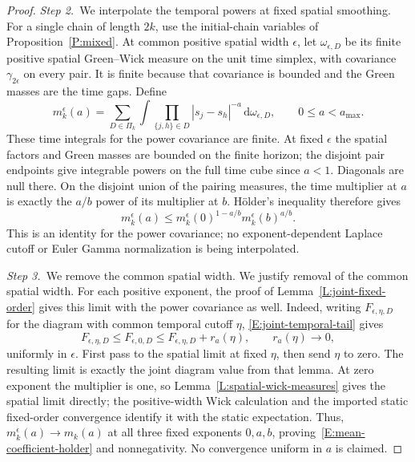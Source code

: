 \documentclass[12pt,oneside,openany]{book}
\numberwithin{equation}{section}
\theoremstyle{nogostyle}
\theoremstyle{definition}
\newcommand{\ud}{\,\mathrm{d}}
\begin{document}
\begin{proof}
  \medskip
  \noindent\textit{Step 2.~}We interpolate the temporal powers at fixed
  spatial smoothing.
  For a single chain of length $2k$, use the initial-chain variables of
  Proposition~\ref{P:mixed}. At common positive spatial width $\epsilon$, let
  $\omega_{\epsilon,D}$ be its finite positive spatial Green--Wick measure on
  the unit time simplex, with covariance $\gamma_{2\epsilon}$ on every pair. It
  is finite because that covariance is bounded and the Green masses are the time
  gaps. Define
  \[
    m_k^\epsilon(a)=\sum_{D\in\Pi_k}\int
    \prod_{\{j,h\}\in D}|s_j-s_h|^{-a}\ud\omega_{\epsilon,D},
    \qquad 0\le a<a_{\max}.
  \]
  These time integrals for the power covariance are finite. At fixed $\epsilon$
  the spatial factors and Green masses are bounded on the finite horizon; the
  disjoint pair endpoints give integrable powers on the full time cube since $a
  < 1$. Diagonals are null there. On the disjoint union of the pairing measures,
  the time multiplier at $a$ is exactly the $a/b$ power of its multiplier at
  $b$. H\"older's inequality therefore gives
  \[
    m_k^\epsilon(a)\le
    m_k^\epsilon(0)^{1-a/b}m_k^\epsilon(b)^{a/b}.
  \]
  This is an identity for the power covariance; no exponent-dependent Laplace
  cutoff or Euler Gamma normalization is being interpolated.


  \medskip
  \noindent\textit{Step 3.~}We remove the common spatial width.
  We justify removal of the common spatial width. For each positive exponent,
  the proof of Lemma~\ref{L:joint-fixed-order} gives this limit with the power
  covariance as well. Indeed, writing $F_{\epsilon,\eta,D}$ for the diagram with
  common temporal cutoff $\eta$, \eqref{E:joint-temporal-tail} gives
  \[
    F_{\epsilon,\eta,D}\le F_{\epsilon,0,D}
    \le F_{\epsilon,\eta,D}+r_a(\eta),\qquad r_a(\eta)\longrightarrow0,
  \]
  uniformly in $\epsilon$. First pass to the spatial limit at fixed $\eta$, then
  send $\eta$ to zero. The resulting limit is exactly the joint diagram value
  from that lemma. At zero exponent the multiplier is one, so
  Lemma~\ref{L:spatial-wick-measures} gives the spatial limit directly; the
  positive-width Wick calculation and the imported static fixed-order
  convergence identify it with the static expectation. Thus, $m_k^\epsilon(a)
  \to m_k(a)$ at all three fixed exponents $0,a,b$,
  proving~\eqref{E:mean-coefficient-holder} and nonnegativity. No convergence
  uniform in $a$ is claimed.



\end{proof}
\end{document}
